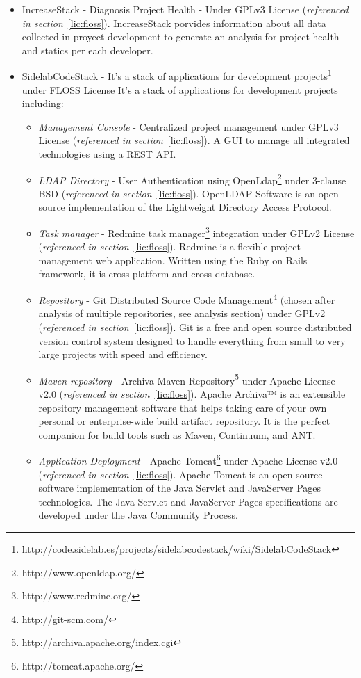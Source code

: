 \documentclass[11pt]{scrartcl}
\begin{document}
\begin{itemize}
    \item IncreaseStack - Diagnosis Project Health - Under GPLv3 License (\emph{referenced in section}~\ref{lic:floss}). IncreaseStack porvides information about all data collected in proyect development to generate an analysis for project health and statics per each developer.
    \item SidelabCodeStack - It's a stack of applications for development projects\footnote{http://code.sidelab.es/projects/sidelabcodestack/wiki/SidelabCodeStack} under FLOSS License %
    It's a stack of applications for development projects including:
    \begin{itemize}
        \item \emph{Management Console} - Centralized project management under GPLv3 License (\emph{referenced in section}~\ref{lic:floss}). A GUI to manage all integrated technologies using a REST API.
        \item \emph{LDAP Directory} - User Authentication using OpenLdap\footnote{http://www.openldap.org/} under 3-clause BSD (\emph{referenced in section}~\ref{lic:floss}). OpenLDAP Software is an open source implementation of the Lightweight Directory Access Protocol.
        \item \emph{Task manager} - Redmine task manager\footnote{http://www.redmine.org/} integration under GPLv2 License (\emph{referenced in section}~\ref{lic:floss}). Redmine is a flexible project management web application. Written using the Ruby on Rails framework, it is cross-platform and cross-database.
        \item \emph{Repository} - Git Distributed Source Code Management\footnote{http://git-scm.com/} (chosen after analysis of multiple repositories, see analysis section) under GPLv2 (\emph{referenced in section}~\ref{lic:floss}). Git is a free and open source distributed version control system designed to handle everything from small to very large projects with speed and efficiency.
        \item \emph{Maven repository} - Archiva Maven Repository\footnote{http://archiva.apache.org/index.cgi} under Apache License v2.0 (\emph{referenced in section}~\ref{lic:floss}).
        Apache Archiva™ is an extensible repository management software that helps taking care of your own personal or enterprise-wide build artifact repository. It is the perfect companion for build tools such as Maven, Continuum, and ANT.
        \item \emph{Application Deployment} - Apache Tomcat\footnote{http://tomcat.apache.org/} under Apache License v2.0 (\emph{referenced in section}~\ref{lic:floss}). Apache Tomcat is an open source software implementation of the Java Servlet and JavaServer Pages technologies. The Java Servlet and JavaServer Pages specifications are developed under the Java Community Process.

\end{itemize}
\end{itemize}
\end{document}
